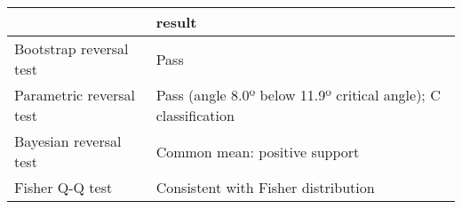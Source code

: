 \begin{tabular}{ll}
\toprule
{} &                                                          result \\
\midrule
Bootstrap reversal test  &                                                            Pass \\
Parametric reversal test &  Pass (angle 8.0º below 11.9º critical angle); C classification \\
Bayesian reversal test   &                                   Common mean: positive support \\
Fisher Q-Q test          &                             Consistent with Fisher distribution \\
\bottomrule
\end{tabular}
